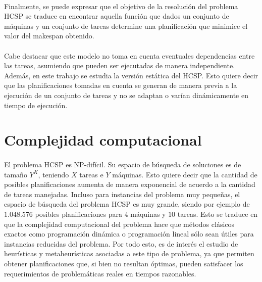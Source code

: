 \newpage %

\paragraph{}Finalmente, se puede expresar que el objetivo de la resolución del problema HCSP se traduce en encontrar aquella función que dados un conjunto de máquinas y un conjunto de tareas determine una planificación que minimice el valor del makespan obtenido.

\paragraph{}Cabe destacar que este modelo no toma en cuenta eventuales dependencias entre las tareas, asumiendo que pueden ser ejecutadas de manera independiente.
Además, en este trabajo se estudia la versión estática del HCSP. Esto quiere decir que las planificaciones tomadas en cuenta se generan de manera previa a la ejecución de un conjunto de tareas y no se adaptan o varían dinámicamente en tiempo de ejecución.

\section{Complejidad computacional} \label{section:descripcion-problema,subsection:complejidad-computacional}

\paragraph{}El problema HCSP es NP-difícil.
Su espacio de búsqueda de soluciones es de tamaño $Y^X$, teniendo $X$ tareas e $Y$ máquinas.
Esto quiere decir que la cantidad de posibles planificaciones aumenta de manera exponencial de acuerdo a la cantidad de tareas manejadas.
Incluso para instancias del problema muy pequeñas, el espacio de búsqueda del problema HCSP es muy grande, siendo por ejemplo de $1.048.576$ posibles planificaciones para $4$ máquinas y $10$ tareas.
Esto se traduce en que la complejidad computacional del problema hace que métodos clásicos exactos como programación dinámica o programación lineal sólo sean útiles para instancias reducidas del problema.
Por todo esto, es de interés el estudio de heurísticas y metaheurísticas asociadas a este tipo de problema, ya que permiten obtener planificaciones que, si bien no resultan óptimas, pueden satisfacer los requerimientos de problemáticas reales en tiempos razonables.

